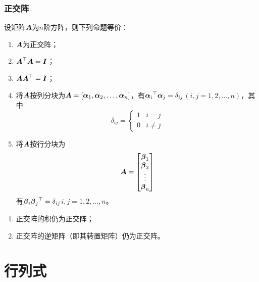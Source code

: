\documentclass{ctexart}
\begin{document}
\subsubsection*{正交阵}

\begin{theorem}
    设矩阵\(\boldsymbol{A}\)为\(n\)阶方阵，则下列命题等价：
    \begin{enumerate}
        \item \(\boldsymbol{A}\)为正交阵；
        \item \(\boldsymbol{A}^\top\boldsymbol{A}=\boldsymbol{I}\)；
        \item \(\boldsymbol{A}\boldsymbol{A}^\top=\boldsymbol{I}\)；
        \item 将\(\boldsymbol{A}\)按列分块为\(\boldsymbol{A}=\left[ {\boldsymbol{\alpha}}_1,{\boldsymbol{\alpha}}_2,\dots,{\boldsymbol{\alpha}}_{n} \right]\)，有\({\boldsymbol{\alpha}_i}^\top\boldsymbol{\alpha}_j=\delta_{ij}\)\((i,j=1,2,\dots,n)\)，其中\begin{equation*}
                  \delta_{ij}=\begin{cases}
                      1 & i=j \\0&i\neq j
                  \end{cases}
              \end{equation*}
        \item 将\(\boldsymbol{A}\)按行分块为\begin{equation*}
                  \boldsymbol{A}=\begin{bmatrix}
                      \boldsymbol{\beta}_1 \\\boldsymbol{\beta}_2\\\vdots\\\boldsymbol{\beta}_n
                  \end{bmatrix}
              \end{equation*}有\(\boldsymbol{\beta}_i{\boldsymbol{\beta}_j}^\top=\delta_{ij}\)\(i,j=1,2,\dots,n\)。
    \end{enumerate}
\end{theorem}

\begin{property}
    \begin{enumerate}
        \item 正交阵的积仍为正交阵；
        \item 正交阵的逆矩阵（即其转置矩阵）仍为正交阵。
    \end{enumerate}
\end{property}

\section{行列式}
\end{document}
